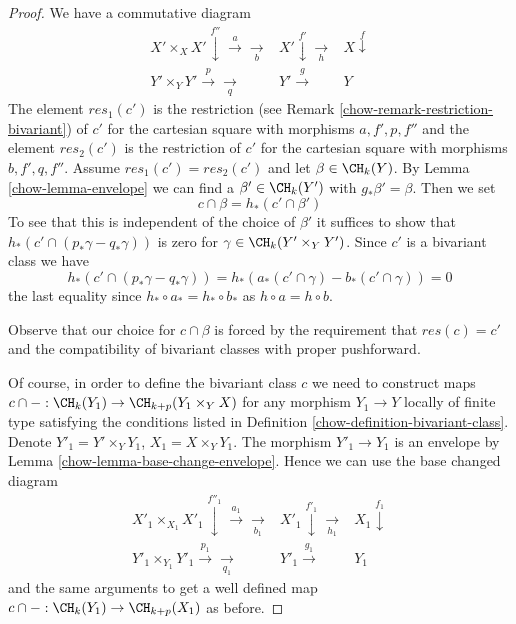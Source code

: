 \begin{proof}

We have a commutative diagram
$$
\begin{array}{ccc}X' \times_X X' \overset{f''}{\downarrow}\overset{a}{\longrightarrow}\underset{b}{\longrightarrow} & X' \overset{f'}{\downarrow}\underset{h}{\longrightarrow} & X \overset{f}{\downarrow} \\ Y' \times_Y Y' \overset{p}{\longrightarrow}\underset{q}{\longrightarrow} & Y' \overset{g}{\longrightarrow} & Y\end{array}
$$
The element $res_1(c')$ is the restriction (see
Remark \ref{chow-remark-restriction-bivariant}) of $c'$ for the cartesian square
with morphisms $a, f', p, f''$ and the element $res_2(c')$ is the restriction
of $c'$ for the cartesian square with morphisms $b, f', q, f''$.
Assume $res_1(c') = res_2(c')$ and let $\beta \in \CH_k(Y)$.
By Lemma \ref{chow-lemma-envelope} we can find a $\beta' \in \CH_k(Y')$
with $g_*\beta' = \beta$. Then we set
$$
c \cap \beta = h_*(c' \cap \beta')
$$
To see that this is independent of the choice of
$\beta'$ it suffices to show that
$h_*(c' \cap (p_*\gamma - q_*\gamma))$ is zero
for $\gamma \in \CH_k(Y' \times_Y Y')$.
Since $c'$ is a bivariant class we have
$$
h_*(c' \cap (p_*\gamma - q_*\gamma)) =
h_*(a_*(c' \cap \gamma) - b_*(c' \cap \gamma)) = 0
$$
the last equality since $h_* \circ a_* = h_* \circ b_*$
as $h \circ a = h \circ b$.

\medskip\noindent
Observe that our choice for $c \cap \beta$ is forced
by the requirement that $res(c) = c'$ and the compatibility
of bivariant classes with proper pushforward.

\medskip\noindent
Of course, in order to define the bivariant class $c$ we need
to construct maps $c \cap -: \CH_k(Y_1) \to \CH_{k + p}(Y_1 \times_Y X)$
for any morphism $Y_1 \to Y$ locally of finite type satisfying the
conditions listed in Definition \ref{chow-definition-bivariant-class}.
Denote $Y'_1 = Y' \times_Y Y_1$, $X_1 = X \times_Y Y_1$.
The morphism $Y'_1 \to Y_1$ is an envelope by
Lemma \ref{chow-lemma-base-change-envelope}. Hence we can use the base
changed diagram
$$
\begin{array}{ccc}X'_1 \times_{X_1} X'_1 \overset{f''_1}{\downarrow}\overset{a_1}{\longrightarrow}\underset{b_1}{\longrightarrow} & X'_1 \overset{f'_1}{\downarrow}\underset{h_1}{\longrightarrow} & X_1 \overset{f_1}{\downarrow} \\ Y'_1 \times_{Y_1} Y'_1 \overset{p_1}{\longrightarrow}\underset{q_1}{\longrightarrow} & Y'_1 \overset{g_1}{\longrightarrow} & Y_1\end{array}
$$
and the same arguments to get a well defined map
$c \cap - : \CH_k(Y_1) \to \CH_{k + p}(X_1)$ as before.


\end{proof}
